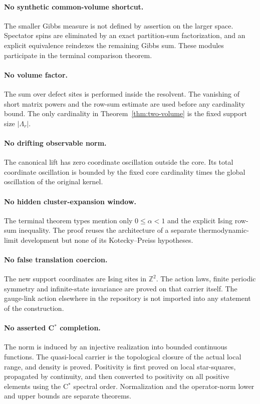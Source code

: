 \documentclass[11pt]{article}
\theoremstyle{definition}
\newcommand{\Z}{\mathbb Z}
\newcommand{\abs}[1]{\lvert #1\rvert}
\begin{document}
\paragraph{No synthetic common-volume shortcut.}
The smaller Gibbs measure is not defined by assertion on the larger space.
Spectator spins are eliminated by an exact partition-sum factorization, and an
explicit equivalence reindexes the remaining Gibbs sum.  These modules
participate in the terminal comparison theorem.

\paragraph{No volume factor.}
The sum over defect sites is performed inside the resolvent.  The vanishing of
short matrix powers and the row-sum estimate are used before any cardinality
bound.  The only cardinality in Theorem~\ref{thm:two-volume} is the fixed
support size $\abs{\Lambda_r}$.

\paragraph{No drifting observable norm.}
The canonical lift has zero coordinate oscillation outside the core.  Its
total coordinate oscillation is bounded by the fixed core cardinality times
the global oscillation of the original kernel.

\paragraph{No hidden cluster-expansion window.}
The terminal theorem types mention only $0\le\alpha<1$ and the explicit Ising
row-sum inequality.  The proof reuses the architecture of a separate
thermodynamic-limit development but none of its Kotecky--Preiss hypotheses.

\paragraph{No false translation coercion.}
The new support coordinates are Ising sites in $\Z^2$.  The action laws,
finite periodic symmetry and infinite-state invariance are proved on that
carrier itself.  The gauge-link action elsewhere in the repository is not
imported into any statement of the construction.

\paragraph{No asserted C$^*$ completion.}
The norm is induced by an injective realization into bounded continuous
functions.  The quasi-local carrier is the topological closure of the actual
local range, and density is proved.  Positivity is first proved on local
star-squares, propagated by continuity, and then converted to positivity on
all positive elements using the C$^*$ spectral order.  Normalization and the
operator-norm lower and upper bounds are separate theorems.
\end{document}
